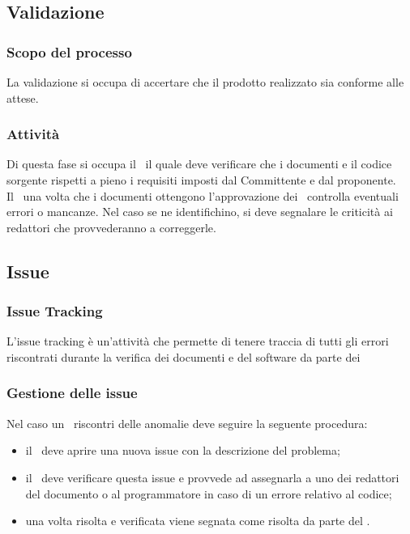\documentclass[../NormeDiProgetto.tex]{subfiles}
\begin{document}
		\subsection{Validazione}
		\subsubsection{Scopo del processo}
		La validazione si occupa di accertare che il prodotto realizzato sia conforme alle attese.\\
		\subsubsection{Attività}
		Di questa fase si occupa il \responsabilediprogetto\ il quale deve verificare che i documenti e il codice sorgente rispetti a pieno i requisiti imposti dal Committente e dal proponente.\\Il \responsabilediprogetto\ una volta che i documenti ottengono l'approvazione dei \verificatori\ controlla eventuali errori o mancanze.
		Nel caso se ne identifichino, si deve segnalare le criticità ai redattori che provvederanno a correggerle.
		
		
		
		\subsection{Issue}
		\subsubsection{Issue Tracking}
		L'issue tracking è un'attività che permette di tenere traccia di tutti gli errori riscontrati durante la verifica dei documenti e del software da parte dei \verificatori\.\\
		\subsubsection{Gestione delle issue}
		Nel caso un \verificatore\ riscontri delle anomalie deve seguire la seguente procedura:
		\begin{itemize}
			\item il \verificatore\ deve aprire una nuova issue con la descrizione del problema;
			\item il \responsabilediprogetto\ deve verificare questa issue e provvede ad assegnarla a uno dei redattori del documento o al programmatore in caso di un errore relativo al codice;
			\item una volta risolta e verificata viene segnata come risolta da parte del \responsabilediprogetto .
		\end{itemize}
\end{document}
